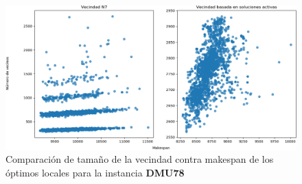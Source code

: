\begin{figure}
    \includegraphics[scale=.6]{Imagenes/compvec78.png}
    \caption{Comparación de tamaño de la vecindad contra makespan de los óptimos locales para la instancia \textbf{DMU78} }
    \label{fig:mattgraph}
\end{figure}

